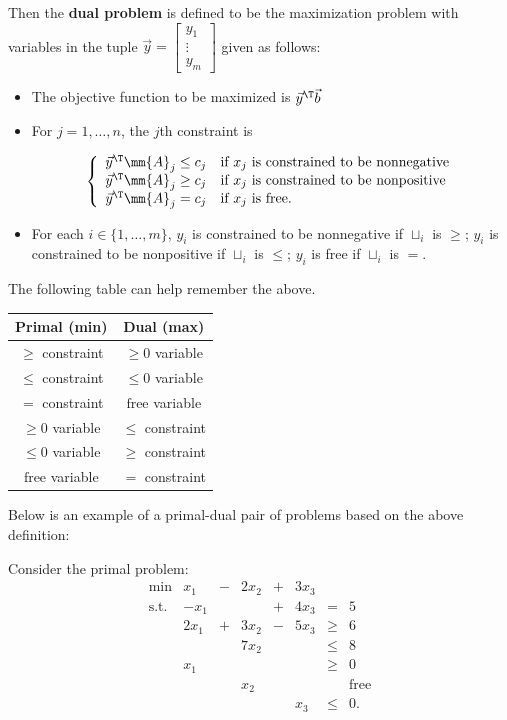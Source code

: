Then the \textbf{dual problem} is defined to be the maximization problem
with variables in the tuple
\(\vec{y} = \begin{bmatrix} y_1\\ \vdots\\ y_m\end{bmatrix}\) given as
follows:

\begin{itemize}
\item
  The objective function to be maximized is \(\vec{y}^\T \vec{b}\)
\item
  For \(j = 1,\ldots, n\), the \(j\)th constraint is

  \begin{equation*}
  \left \{\begin{array}{ll}
  \vec{y}^\T\mm{A}_j \leq c_j & \text{if } x_j \text{ is constrained to 
  be nonnegative} \\
  \vec{y}^\T\mm{A}_j \geq c_j & \text{if } x_j \text{ is constrained to 
  be nonpositive} \\
  \vec{y}^\T\mm{A}_j = c_j & \text{if } x_j \text{ is free}.
  \end{array}\right.
  \end{equation*}
\item
  For each \(i \in \{1,\ldots,m\}\), \(y_i\) is constrained to be
  nonnegative if \(\sqcup_i\) is \(\geq\); \(y_i\) is constrained to be
  nonpositive if \(\sqcup_i\) is \(\leq\); \(y_i\) is free if
  \(\sqcup_i\) is \(=\).
\end{itemize}

The following table can help remember the above.

\begin{longtable}[]{@{}cc@{}}
\toprule
Primal (min) & Dual (max)\tabularnewline
\midrule
\endhead
\(\geq\) constraint & \(\geq 0\) variable\tabularnewline
\(\leq\) constraint & \(\leq 0\) variable\tabularnewline
\(=\) constraint & \(\text{free}\) variable\tabularnewline
\(\geq 0\) variable & \(\leq\) constraint\tabularnewline
\(\leq 0\) variable & \(\geq\) constraint\tabularnewline
\(\text{free}\) variable & \(=\) constraint\tabularnewline
\bottomrule
\end{longtable}

Below is an example of a primal-dual pair of problems based on the above
definition:

Consider the primal problem: \[\begin{array}{rrcrcrcl}
\mbox{min} &  x_1 & - & 2x_2 & + & 3x_3 & \\
\mbox{s.t.} & -x_1 &   &      & + & 4x_3 &  =   &5 \\
            & 2x_1 & + & 3x_2 & - & 5x_3 & \geq &  6 \\
            &      &   & 7x_2 &   &      & \leq &  8 \\
            &  x_1 &   &      &   &      & \geq &  0 \\
            &     &    & x_2  &   &      & &      \mbox{free} \\
            &     &    &      &   & x_3  & \leq & 0.\\
\end{array}\]


